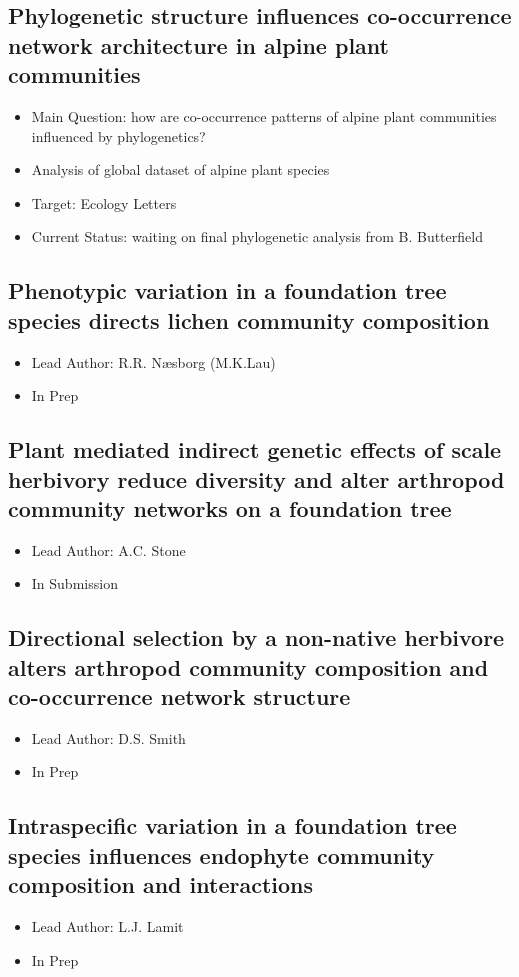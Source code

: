 \documentclass[12pt]{article}
\begin{document}
\subsection{Phylogenetic structure influences co-occurrence network
  architecture in alpine plant communities}
\begin{itemize}
\item Main Question: how are co-occurrence patterns of alpine plant
  communities influenced by phylogenetics?
\item Analysis of global dataset of alpine plant species
\item Target: Ecology Letters
\item Current Status: waiting on final phylogenetic analysis from
  B. Butterfield
\end{itemize}


\subsection{Phenotypic variation in a foundation tree species directs
  lichen community composition}
\begin{itemize}
\item Lead Author: R.R. N\ae sborg (M.K.Lau)
\item In Prep
\end{itemize}

\subsection{Plant mediated indirect genetic effects of scale herbivory
reduce diversity and alter arthropod community networks on a
foundation tree}
\begin{itemize}
\item Lead Author: A.C. Stone
\item In Submission
\end{itemize}

\subsection{Directional selection by a non-native herbivore
  alters arthropod community composition and co-occurrence network
  structure} 
\begin{itemize}
\item Lead Author: D.S. Smith
\item In Prep
\end{itemize}

\subsection{Intraspecific variation in a foundation tree
  species influences endophyte community composition and interactions}
\begin{itemize}
\item Lead Author: L.J. Lamit
\item In Prep
\end{itemize}
\end{document}
